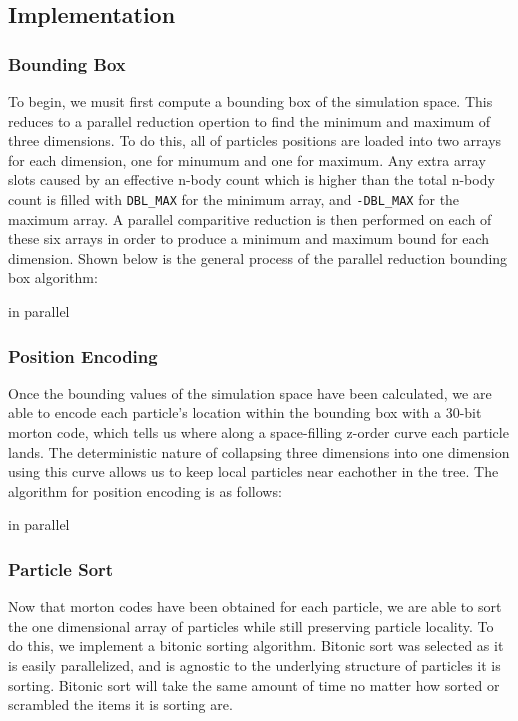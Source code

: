 \documentclass{thesis}
\begin{document}
\subsection{Implementation}
\subsubsection{Bounding Box}
To begin, we musit first compute a bounding box of the simulation space. This reduces to a parallel reduction opertion to find the minimum and maximum of three dimensions. To do this, all of particles positions are loaded into two arrays for each dimension, one for minumum and one for maximum. Any extra array slots caused by an effective n-body count which is higher than the total n-body count is filled with \verb|DBL_MAX| for the minimum array, and \verb|-DBL_MAX| for the maximum array. A parallel comparitive reduction is then performed on each of these six arrays in order to produce a minimum and maximum bound for each dimension. Shown below is the general process of the parallel reduction bounding box algorithm:

\begin{algorithmic}
         in parallel
        \EndFor
    \EndFor
\end{algorithmic}
\subsubsection{Position Encoding}
Once the bounding values of the simulation space have been calculated, we are able to encode each particle's location within the bounding box with a 30-bit morton code, which tells us where along a space-filling z-order curve each particle lands. The deterministic nature of collapsing three dimensions into one dimension using this curve allows us to keep local particles near eachother in the tree. The algorithm for position encoding is as follows:

\begin{algorithmic}
     in parallel    
    \EndFor
\end{algorithmic}
\subsubsection{Particle Sort}
Now that morton codes have been obtained for each particle, we are able to sort the one dimensional array of particles while still preserving particle locality. To do this, we implement a bitonic sorting algorithm. Bitonic sort was selected as it is easily parallelized, and is agnostic to the underlying structure of particles it is sorting. Bitonic sort will take the same amount of time no matter how sorted or scrambled the items it is sorting are.
\end{document}
